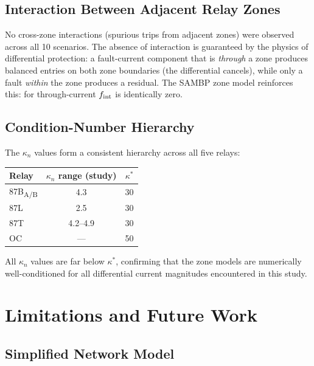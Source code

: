 \documentclass[12pt,a4paper]{article}
\newcommand{\kn}{\kappa_n}
\newcommand{\fint}{f_{\rm int}}
\begin{document}
\subsection{Interaction Between Adjacent Relay Zones}

No cross-zone interactions (spurious trips from adjacent zones) were
observed across all 10 scenarios.  The absence of interaction is
guaranteed by the physics of differential protection: a fault-current
component that is \emph{through} a zone produces balanced entries on
both zone boundaries (the differential cancels), while only a fault
\emph{within} the zone produces a residual.  The SAMBP zone model
reinforces this: for through-current $\fint$ is identically zero.

\subsection{Condition-Number Hierarchy}

The $\kn$ values form a consistent hierarchy across all five relays:

\begin{center}
\begin{tabular}{lcc}
  \toprule
  Relay & $\kn$ range (study) & $\kappa^*$ \\
  \midrule
  87B\textsubscript{A/B} & 4.3 & 30 \\
  87L                    & 2.5 & 30 \\
  87T                    & 4.2--4.9 & 30 \\
  OC                     & --- & 50 \\
  \bottomrule
\end{tabular}
\end{center}

All $\kn$ values are far below $\kappa^*$, confirming that the zone
models are numerically well-conditioned for all differential current
magnitudes encountered in this study.

\section{Limitations and Future Work}

\subsection{Simplified Network Model}
\end{document}
